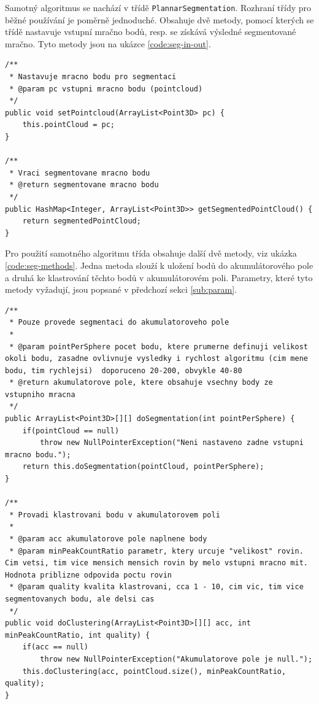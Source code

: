 \documentclass[11pt,twoside,a4paper]{book}
\begin{document}
Samotný algoritmus se nachází v třídě \verb|PlannarSegmentation|. Rozhraní třídy pro běžné používání je poměrně jednoduché. Obsahuje dvě metody, pomocí kterých se třídě nastavuje vstupní mračno bodů, resp. se získává výsledné segmentované mračno. Tyto metody jsou na ukázce \ref{code:seg-in-out}.

\begin{lstlisting}[label=code:seg-in-out,caption={Metody pro nastavení vstupu a získání výstup algoritmu.}]
/**
 * Nastavuje mracno bodu pro segmentaci
 * @param pc vstupni mracno bodu (pointcloud)
 */
public void setPointcloud(ArrayList<Point3D> pc) {
	this.pointCloud = pc;
}

/**
 * Vraci segmentovane mracno bodu
 * @return segmentovane mracno bodu
 */
public HashMap<Integer, ArrayList<Point3D>> getSegmentedPointCloud() {
	return segmentedPointCloud;
}
\end{lstlisting}

Pro použití samotného algoritmu třída obsahuje další dvě metody, viz ukázka \ref{code:seg-methods}. Jedna metoda slouží k uložení bodů do akumulátorového pole a druhá ke klastrování těchto bodů v akumulátorovém poli. Parametry, které tyto metody vyžadují, jsou popsané v předchozí sekci \ref{sub:param}.

\begin{lstlisting}[label={code:seg-methods},caption={Metody určené pro používání algoritmu.}]
/**
 * Pouze provede segmentaci do akumulatoroveho pole
 * 
 * @param pointPerSphere pocet bodu, ktere prumerne definuji velikost okoli bodu, zasadne ovlivnuje vysledky i rychlost algoritmu (cim mene bodu, tim rychlejsi)  doporuceno 20-200, obvykle 40-80
 * @return akumulatorove pole, ktere obsahuje vsechny body ze vstupniho mracna
 */
public ArrayList<Point3D>[][] doSegmentation(int pointPerSphere) {
	if(pointCloud == null)
	    throw new NullPointerException("Neni nastaveno zadne vstupni mracno bodu.");
	return this.doSegmentation(pointCloud, pointPerSphere);
}

/**
 * Provadi klastrovani bodu v akumulatorovem poli
 * 
 * @param acc akumulatorove pole naplnene body
 * @param minPeakCountRatio parametr, ktery urcuje "velikost" rovin. Cim vetsi, tim vice mensich mensich rovin by melo vstupni mracno mit. Hodnota priblizne odpovida poctu rovin
 * @param quality kvalita klastrovani, cca 1 - 10, cim vic, tim vice segmentovanych bodu, ale delsi cas
 */
public void doClustering(ArrayList<Point3D>[][] acc, int minPeakCountRatio, int quality) {
	if(acc == null)
	    throw new NullPointerException("Akumulatorove pole je null.");
	this.doClustering(acc, pointCloud.size(), minPeakCountRatio, quality);
}
\end{lstlisting}
\end{document}
